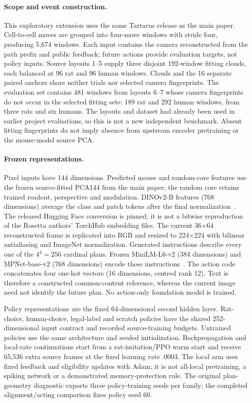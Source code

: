 \documentclass[10pt,onecolumn,letterpaper]{article}
\begin{document}
\paragraph{Scope and event construction.}
This exploratory extension uses the same Tartarus release as the main paper. Cell-to-cell moves are grouped into
four-move windows with stride four, producing 5,674 windows. Each input contains the camera reconstructed from
the path prefix and public feedback; future actions provide evaluation targets, not policy inputs. Source layouts
1--5 supply three disjoint 192-window fitting clouds, each balanced at 96 rat and 96 human windows. Clouds and the
16 separate paired anchors share neither trials nor selected camera fingerprints. The evaluation set contains
481 windows from layouts 6--7 whose camera fingerprints do not occur in the selected fitting sets: 189 rat and
292 human windows, from three rats and six humans. The layouts and dataset had already been used in earlier
project evaluations, so this is not a new independent benchmark. Absent fitting fingerprints do not imply absence
from upstream encoder pretraining or the mouse-model source PCA.

\paragraph{Frozen representations.}
Pixel inputs have 144 dimensions. Predicted mouse and random-core features use the frozen source-fitted PCA144
from the main paper; the random core retains trained readout, perspective and modulation. DINOv2-B features
(768 dimensions) average the class and patch tokens after the final normalization~\cite{oquab2023dinov2}.
The released Hugging Face conversion is pinned; it is not a bitwise reproduction of the Rosetta authors'
TorchHub embedding files. The current 36$\times$64 reconstructed frame is replicated into RGB and resized to
224$\times$224 with bilinear antialiasing and ImageNet normalization. Generated instructions describe every one
of the $4^4=256$ cardinal plans. Frozen MiniLM-L6-v2 (384 dimensions) and MPNet-base-v2 (768 dimensions) encode
these instructions~\cite{wang2020minilm,song2020mpnet}. The action code concatenates four one-hot vectors
(16 dimensions, centred rank 12). Text is therefore a constructed common-content reference, whereas the current
image need not identify the future plan. No action-only foundation model is trained.

Policy representations are the fixed 64-dimensional second hidden layer. Rat-choice, human-choice, legal-label
and scratch policies have the shared 252-dimensional input contract and recorded source-training budgets.
Untrained policies use the same architecture and seeded initialization. Backpropagation and local-rate
continuations start from a rat-imitation/PPO warm start and receive 65,536 extra source frames at the fixed
learning rate .0003. The local arm uses fixed feedback and eligibility updates with Adam; it is not all-local
pretraining, a spiking network or a demonstrated memory-protection rule. The original plan-geometry diagnostic
exports three policy-training seeds per family; the completed alignment/acting comparison fixes policy seed 60.
\end{document}

